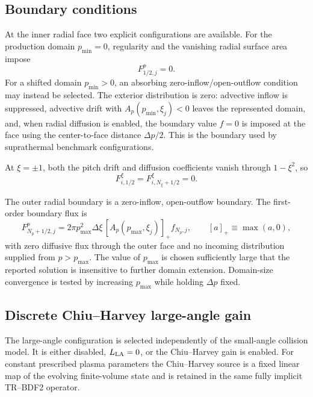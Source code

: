 \documentclass[11pt]{article}
\begin{document}
\subsection{Boundary conditions}

At the inner radial face two explicit configurations are available.  For the production
domain $p_{\min}=0$, regularity and the vanishing radial surface area impose
\begin{equation}
 F^p_{1/2,j}=0.
 \label{eq:inner_zero_flux}
\end{equation}
For a shifted domain $p_{\min}>0$, an absorbing zero-inflow/open-outflow condition may
instead be selected.  The exterior distribution is zero: advective inflow is suppressed,
advective drift with $A_p(p_{\min},\xi_j)<0$ leaves the represented domain, and, when
radial diffusion is enabled, the boundary value $f=0$ is imposed at the face using the
center-to-face distance $\Delta p/2$.  This is the boundary used by suprathermal
benchmark configurations.

At $\xi=\pm1$, both the pitch drift and diffusion coefficients vanish through
$1-\xi^2$, so
\begin{equation}
 F^\xi_{i,1/2}=F^\xi_{i,N_\xi+1/2}=0.
 \label{eq:pitch_boundary_flux}
\end{equation}

The outer radial boundary is a zero-inflow, open-outflow boundary.  The first-order
boundary flux is
\begin{equation}
 F^p_{N_p+1/2,j}
 =2\pi p_{\max}^2\Delta\xi\,
  \left[A_p(p_{\max},\xi_j)\right]_+ f_{N_p,j},
 \qquad [a]_+\equiv\max(a,0),
 \label{eq:outer_flux}
\end{equation}
with zero diffusive flux through the outer face and no incoming distribution supplied
from $p>p_{\max}$.  The value of $p_{\max}$ is chosen sufficiently large that the
reported solution is insensitive to further domain extension.  Domain-size convergence
is tested by increasing $p_{\max}$ while holding $\Delta p$ fixed.

\subsection{Discrete Chiu--Harvey large-angle gain}

The large-angle configuration is selected independently of the small-angle collision
model.  It is either disabled, $L_{\rm LA}=0$, or the Chiu--Harvey gain is enabled.  For
constant prescribed plasma parameters the Chiu--Harvey source is a fixed linear map of
the evolving finite-volume state and is retained in the same fully implicit TR--BDF2
operator.
\end{document}
